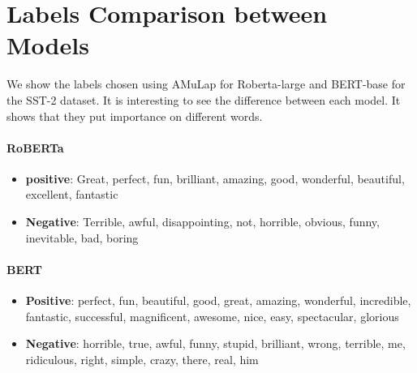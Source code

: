 \section{Labels Comparison between Models}

We show the labels chosen using AMuLap for Roberta-large and BERT-base for the SST-2 dataset. It is interesting to see the difference between each model. It shows that they put importance on different words.

\paragraph{RoBERTa}
\begin{itemize}
\item \textbf{positive}: Great, perfect, fun, brilliant, amazing, good, wonderful, beautiful, excellent, fantastic
\item \textbf{Negative}: Terrible, awful, disappointing, not, horrible, obvious, funny, inevitable, bad, boring
\end{itemize}
\paragraph{BERT}
\begin{itemize}
\item \textbf{Positive}: perfect, fun, beautiful, good, great, amazing, wonderful, incredible, fantastic, successful, magnificent, awesome, nice, easy, spectacular, glorious
\item \textbf{Negative}: horrible, true, awful, funny, stupid, brilliant, wrong, terrible, me, ridiculous, right, simple, crazy, there, real, him
\end{itemize}





